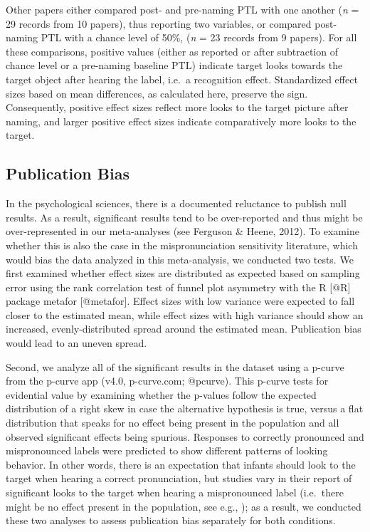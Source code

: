 \documentclass[man]{apa6}
\theoremstyle{definition}
\theoremstyle{definition}
\theoremstyle{definition}
\theoremstyle{remark}
\begin{document}
Other papers either compared post- and pre-naming PTL with one another
(\emph{n} = 29 records from 10 papers), thus reporting two variables, or
compared post-naming PTL with a chance level of 50\%, (\emph{n} = 23
records from 9 papers). For all these comparisons, positive values
(either as reported or after subtraction of chance level or a pre-naming
baseline PTL) indicate target looks towards the target object after
hearing the label, i.e.~a recognition effect. Standardized effect sizes
based on mean differences, as calculated here, preserve the sign.
Consequently, positive effect sizes reflect more looks to the target
picture after naming, and larger positive effect sizes indicate
comparatively more looks to the target.

\subsection{Publication Bias}\label{publication-bias}

In the psychological sciences, there is a documented reluctance to
publish null results. As a result, significant results tend to be
over-reported and thus might be over-represented in our meta-analyses
(see Ferguson \& Heene, 2012). To examine whether this is also the case
in the mispronunciation sensitivity literature, which would bias the
data analyzed in this meta-analysis, we conducted two tests. We first
examined whether effect sizes are distributed as expected based on
sampling error using the rank correlation test of funnel plot asymmetry
with the R {[}@R{]} package metafor {[}@metafor{]}. Effect sizes with
low variance were expected to fall closer to the estimated mean, while
effect sizes with high variance should show an increased,
evenly-distributed spread around the estimated mean. Publication bias
would lead to an uneven spread.

Second, we analyze all of the significant results in the dataset using a
p-curve from the p-curve app (v4.0, p-curve.com; @pcurve). This p-curve
tests for evidential value by examining whether the p-values follow the
expected distribution of a right skew in case the alternative hypothesis
is true, versus a flat distribution that speaks for no effect being
present in the population and all observed significant effects being
spurious. Responses to correctly pronounced and mispronounced labels
were predicted to show different patterns of looking behavior. In other
words, there is an expectation that infants should look to the target
when hearing a correct pronunciation, but studies vary in their report
of significant looks to the target when hearing a mispronounced label
(i.e.~there might be no effect present in the population, see e.g., );
as a result, we conducted these two analyses to assess publication bias
separately for both conditions.
\end{document}
